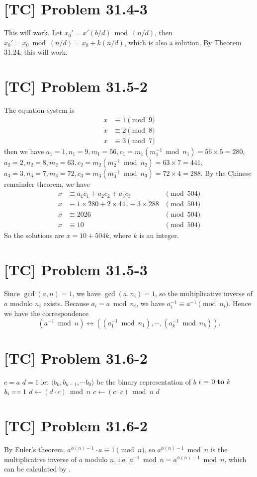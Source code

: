 \documentclass[a4paper,11pt,twocolumn]{article}
\begin{document}
  \section{[TC] Problem 31.4-3}
  This will work. Let $x_0' = x'(b/d) \bmod (n/d)$, then $x_0' = x_0 \bmod (n/d) = x_0 + k(n/d)$, which is also a solution. By Theorem 31.24, this will work.

  \section{[TC] Problem 31.5-2}
  The equation system is 
  \begin{align*}
    x &\equiv 1 \pmod 9 \\
    x &\equiv 2 \pmod 8 \\
    x &\equiv 3 \pmod 7
  \end{align*}
  then we have $a_1 = 1, n_1 = 9, m_1 = 56, c_1 = m_1(m_1^{-1} \bmod n_1) = 56 \times 5 = 280$, $a_2 = 2, n_2 = 8, m_2 = 63, c_2 = m_2(m_2^{-1} \bmod n_2) = 63 \times 7 = 441$, $a_3 = 3,  n_3 = 7, m_3 = 72, c_3 = m_3(m_3^{-1} \bmod n_3) = 72 \times 4 = 288$. By the Chinese remainder theorem, we have
  \begin{align*}
    x &\equiv a_1c_1 + a_2c_2 + a_3c_3 & \pmod {504} \\
    x &\equiv 1 \times 280 + 2 \times 441 + 3 \times 288 & \pmod {504} \\
    x &\equiv 2026 & \pmod {504} \\
    x &\equiv 10 & \pmod {504} 
  \end{align*}
  So the solutions are $x = 10 + 504k$, where $k$ is an integer.
  
  \section{[TC] Problem 31.5-3}
  Since $\gcd(a, n) = 1$, we have $\gcd(a, n_i) = 1$, so the multiplicative inverse of $a$ modulo $n_i$ exists. Because $a_i = a \bmod n_i$, we have $a_i^{-1} \equiv a^{-1} \pmod {n_i}$. Hence we have the correspondence
   $$ (a^{-1} \bmod n) \leftrightarrow ((a_1^{-1} \bmod n_1),\cdots, (a_k^{-1} \bmod n_k)). $$
   
  \section{[TC] Problem 31.6-2}
  \begin{codebox}
  \li $c = a$
  \li $d = 1$
  \li let $\langle b_k, b_{k-1}, \cdots b_0 \rangle$ be the binary representation of $b$
  \li \For $i \gets 0 \To k$
  \li \Do \If $b_i \isequal 1$
  \li     \Do $d \gets (d \cdot c) \bmod n$
          \End
  \li     $c \gets (c \cdot c) \bmod n$
      \End
  \li \Return $d$
  \end{codebox}
  
  \section{[TC] Problem 31.6-2}
  By Euler's theorem, $a^{\phi(n)-1} \cdot a \equiv 1 \pmod n$, so $a^{\phi(n)-1} \bmod n$ is the multiplicative inverse of $a$ modulo $n$, i.e. $a^{-1} \bmod n = a^{\phi(n)-1} \bmod n$, which can be calculated by .
  
\end{document}
